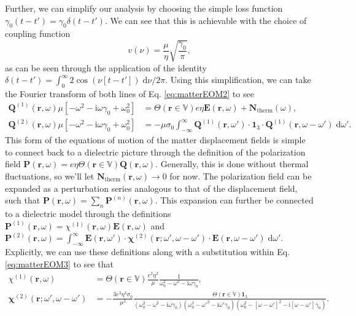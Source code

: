 Further, we can simplify our analysis by choosing the simple loss function $\gamma_0(t - t') = \gamma_0\delta(t - t')$. We can see that this is achievable with the choice of coupling function
\begin{equation}
v(\nu) = \frac{\mu}{\eta}\sqrt{\frac{\gamma_0}{\pi}},
\end{equation}
as can be seen through the application of the identity $\delta(t - t') = \int_0^\infty 2\cos(\nu[t - t'])\;\mathrm{d}\nu/2\pi$. Using this simplification, we can take the Fourier transform of both lines of Eq. \eqref{eq:matterEOM2} to see
\begin{equation}\label{eq:matterEOM3}
\begin{split}
\mathbf{Q}^{(1)}(\mathbf{r},\omega)\mu\left[-\omega^2 - \mathrm{i}\omega\gamma_0 + \omega_0^2\right] &= \Theta(\mathbf{r}\in\mathbb{V})e\eta\mathbf{E}(\mathbf{r},\omega) + \mathbf{N}_\mathrm{therm}(\omega),\\
\mathbf{Q}^{(2)}(\mathbf{r},\omega)\mu\left[-\omega^2 - \mathrm{i}\omega\gamma_0 + \omega_0^2\right] &= -\mu\sigma_0\int_{-\infty}^\infty\mathbf{Q}^{(1)}(\mathbf{r},\omega')\cdot\bm{1}_3\cdot\mathbf{Q}^{(1)}(\mathbf{r},\omega - \omega')\;\mathrm{d}\omega'.
\end{split}
\end{equation}
This form of the equations of motion of the matter displacement fields is simple to connect back to a dielectric picture through the definition of the polarization field $\mathbf{P}(\mathbf{r},\omega) = e\eta\Theta(\mathbf{r}\in\mathbb{V})\mathbf{Q}(\mathbf{r},\omega)$. Generally, this is done without thermal fluctuations, so we'll let $\mathbf{N}_\mathrm{therm}(\mathbf{r},\omega)\to0$ for now. The polarization field can be expanded as a perturbation series analogous to that of the displacement field, such that $\mathbf{P}(\mathbf{r},\omega) = \sum_n\mathbf{P}^{(n)}(\mathbf{r},\omega)$. This expansion can further be connected to a dielectric model through the definitions $\mathbf{P}^{(1)}(\mathbf{r},\omega) = \chi^{(1)}(\mathbf{r},\omega)\mathbf{E}(\mathbf{r},\omega)$ and $\mathbf{P}^{(2)}(\mathbf{r},\omega) = \int_{-\infty}^\infty\mathbf{E}(\mathbf{r},\omega')\cdot\bm{\chi}^{(2)}(\mathbf{r};\omega',\omega - \omega')\cdot\mathbf{E}(\mathbf{r},\omega - \omega')\;\mathrm{d}\omega'$. Explicitly, we can use these definitions along with a substitution within Eq. \eqref{eq:matterEOM3} to see that
\begin{equation}
\begin{split}
\chi^{(1)}(\mathbf{r},\omega) &= \Theta(\mathbf{r}\in\mathbb{V})\frac{e^2\eta^2}{\mu}\frac{1}{\omega_0^2 - \omega^2 - \mathrm{i}\omega\gamma_0},\\
\bm{\chi}^{(2)}(\mathbf{r};\omega',\omega - \omega') &= -\frac{3e^3\eta^3\sigma_0}{\mu^2}\frac{\Theta(\mathbf{r}\in\mathbb{V})\bm{1}_3}{(\omega_0^2 - \omega^2 - \mathrm{i}\omega\gamma_0)(\omega_0^2 - \omega'^2 - \mathrm{i}\omega'\gamma_0)(\omega_0^2 - [\omega - \omega']^2 - \mathrm{i}[\omega - \omega']\gamma_0)}.
\end{split}
\end{equation}

